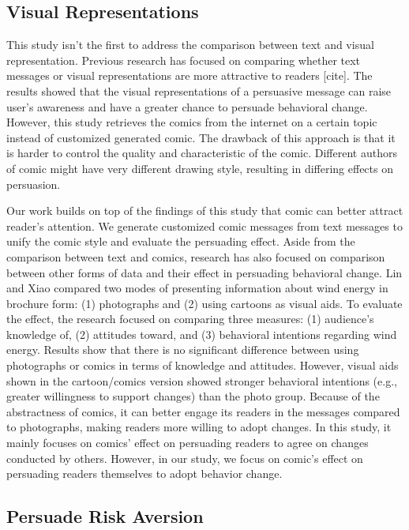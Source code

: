 \subsection{Visual Representations}
This study isn't the first to address the comparison between text and visual representation. Previous research has focused on comparing whether text messages or visual representations are more attractive to readers [cite]. The results showed that the visual representations of a persuasive message can raise user's awareness and have a greater chance to persuade behavioral change. However, this study retrieves the comics from the internet on a certain topic instead of customized generated comic. The drawback of this approach is that it is harder to control the quality and characteristic of the comic. Different authors of comic might have very different drawing style, resulting in differing effects on persuasion.\par
Our work builds on top of the findings of this study that comic can better attract reader's attention. We generate customized comic messages from text messages to unify the comic style and evaluate the persuading effect. Aside from the comparison between text and comics, research has also focused on comparison between other forms of data and their effect in persuading behavioral change. Lin and Xiao compared two modes of presenting information about wind energy in brochure form: (1) photographs and (2) using cartoons as visual aids. To evaluate the effect, the research focused on comparing three measures: (1) audience's knowledge of, (2) attitudes toward, and (3) behavioral intentions regarding wind energy. Results show that there is no significant difference between using photographs or comics in terms of knowledge and attitudes. However, visual aids shown in the cartoon/comics version showed stronger behavioral intentions (e.g., greater willingness to support changes) than the photo group. Because of the abstractness of comics, it can better engage its readers in the messages compared to photographs, making readers more willing to adopt changes. In this study, it mainly focuses on comics' effect on persuading readers to agree on changes conducted by others. However, in our study, we focus on comic's effect on persuading readers themselves to adopt behavior change.\par
\subsection{Persuade Risk Aversion}


